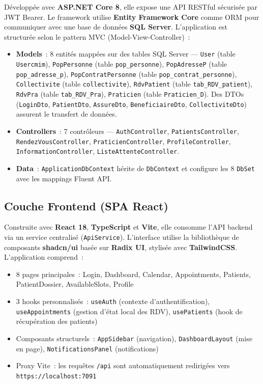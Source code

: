 Développée avec \textbf{ASP.NET Core 8}, elle expose une API RESTful sécurisée par JWT Bearer. Le framework utilise \textbf{Entity Framework Core} comme ORM pour communiquer avec une base de données \textbf{SQL Server}. L'application est structurée selon le pattern MVC (Model-View-Controller)~:

\begin{itemize}
    \item \textbf{Models}~: 8 entités mappées sur des tables SQL Server --- \texttt{User} (table \texttt{Usercmim}), \texttt{PopPersonne} (table \texttt{pop\_personne}), \texttt{PopAdresseP} (table \texttt{pop\_adresse\_p}), \texttt{PopContratPersonne} (table \texttt{pop\_contrat\_personne}), \texttt{Collectivite} (table \texttt{collectivite}), \texttt{RdvPatient} (table \texttt{tab\_RDV\_patient}), \texttt{RdvPra} (table \texttt{tab\_RDV\_Pra}), \texttt{Praticien} (table \texttt{Praticien\_D}). Des DTOs (\texttt{LoginDto}, \texttt{PatientDto}, \texttt{AssureDto}, \texttt{BeneficiaireDto}, \texttt{CollectiviteDto}) assurent le transfert de données.
    \item \textbf{Controllers}~: 7 contrôleurs --- \texttt{AuthController}, \texttt{PatientsController}, \texttt{RendezVousController}, \texttt{PraticienController}, \texttt{ProfileController}, \texttt{InformationController}, \texttt{ListeAttenteController}.
    \item \textbf{Data}~: \texttt{ApplicationDbContext} hérite de \texttt{DbContext} et configure les 8 \texttt{DbSet} avec les mappings Fluent API.
\end{itemize}

\subsection{Couche Frontend (SPA React)}

Construite avec \textbf{React 18}, \textbf{TypeScript} et \textbf{Vite}, elle consomme l'API backend via un service centralisé (\texttt{ApiService}). L'interface utilise la bibliothèque de composants \textbf{shadcn/ui} basée sur \textbf{Radix UI}, stylisée avec \textbf{TailwindCSS}. L'application comprend~:

\begin{itemize}
    \item 8 pages principales~: Login, Dashboard, Calendar, Appointments, Patients, PatientDossier, AvailableSlots, Profile
    \item 3 hooks personnalisés~: \texttt{useAuth} (contexte d'authentification), \texttt{useAppointments} (gestion d'état local des RDV), \texttt{usePatients} (hook de récupération des patients)
    \item Composants structurels~: \texttt{AppSidebar} (navigation), \texttt{DashboardLayout} (mise en page), \texttt{NotificationsPanel} (notifications)
    \item Proxy Vite~: les requêtes \texttt{/api} sont automatiquement redirigées vers \texttt{https://localhost:7091}
\end{itemize}


